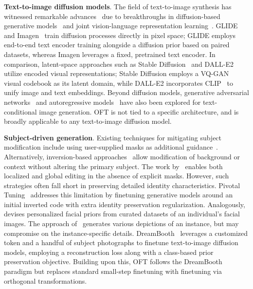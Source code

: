\textbf{Text-to-image diffusion models}. The field of text-to-image synthesis has witnessed remarkable advances~\cite{saharia2022photorealistic,ramesh2022hierarchical,rombach2022high,gu2022vector,nichol2022glide} due to breakthroughs in diffusion-based generative models~\cite{ho2020denoising,song2021score,song2021denoising,dhariwal2021diffusion} and joint vision-language representation learning~\cite{su2020vlbert,lu2019vilbert,radford2021learning,wang2021simvlm,li2022blip,li2023blip,alayrac2022flamingo,schuhmann2022laion}. GLIDE~\cite{nichol2022glide} and Imagen~\cite{saharia2022photorealistic} train diffusion processes directly in pixel space; GLIDE employs end-to-end text encoder training alongside a diffusion prior based on paired datasets, whereas Imagen leverages a fixed, pretrained text encoder. In comparison, latent-space approaches such as Stable Diffusion~\cite{rombach2022high} and DALL-E2~\cite{ramesh2022hierarchical} utilize encoded visual representations; Stable Diffusion employs a VQ-GAN~\cite{esser2021taming} visual codebook as its latent domain, while DALL-E2 incorporates CLIP~\cite{radford2021learning} to unify image and text embeddings. Beyond diffusion models, generative adversarial networks~\cite{reed2016generative,zhang2017stackgan,xu2018attngan,li2019controllable} and autoregressive models~\cite{ramesh2021zero,ding2021cogview,wu2022nuwa,yuscaling} have also been explored for text-conditional image generation. OFT is not tied to a specific architecture, and is broadly applicable to any text-to-image diffusion model.

\textbf{Subject-driven generation}. Existing techniques for mitigating subject modification include using user-supplied masks as additional guidance~\cite{avrahami2022blended,nichol2022glide}. Alternatively, inversion-based approaches~\cite{choi2021ilvr,dhariwal2021diffusion,ramesh2022hierarchical,gal2022image} allow modification of background or context without altering the primary subject. The work by~\cite{hertz2022prompt} enables both localized and global editing in the absence of explicit masks. However, such strategies often fall short in preserving detailed identity characteristics. Pivotal Tuning~\cite{roich2022pivotal} addresses this limitation by finetuning generative models around an initial inverted code with extra identity preservation regularization. Analogously,~\cite{nitzan2022mystyle} devises personalized facial priors from curated datasets of an individual's facial images. The approach of~\cite{casanova2021instance} generates various depictions of an instance, but may compromise on the instance-specific details. DreamBooth~\cite{ruiz2023dreambooth} leverages a customized token and a handful of subject photographs to finetune text-to-image diffusion models, employing a reconstruction loss along with a class-based prior preservation objective. Building upon this, OFT follows the DreamBooth paradigm but replaces standard small-step finetuning with finetuning via orthogonal transformations.

